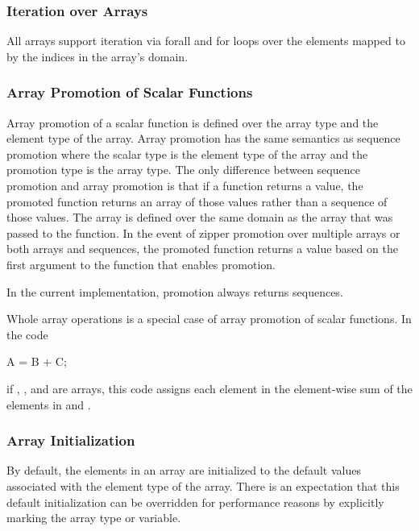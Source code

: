\subsubsection{Iteration over Arrays}
\label{Iteration_over_Arrays}

All arrays support iteration via forall and for loops over the
elements mapped to by the indices in the array's domain.

\subsubsection{Array Promotion of Scalar Functions}
\label{Array_Promotion_of_Scalar_Functions}

Array promotion of a scalar function is defined over the array type
and the element type of the array.  Array promotion has the same
semantics as sequence promotion where the scalar type is the element
type of the array and the promotion type is the array type.  The only
difference between sequence promotion and array promotion is that if a
function returns a value, the promoted function returns an array of
those values rather than a sequence of those values.  The array is
defined over the same domain as the array that was passed to the
function.  In the event of zipper promotion over multiple arrays or
both arrays and sequences, the promoted function returns a value based
on the first argument to the function that enables promotion.

\begin{implementation}
In the current implementation, promotion always returns sequences.
\end{implementation}

\begin{example}
Whole array operations is a special case of array promotion of scalar
functions.  In the code
\begin{chapel}
A = B + C;
\end{chapel}
if , , and  are arrays, this code assigns each
element in  the element-wise sum of the elements in 
and .
\end{example}

\subsubsection{Array Initialization}
\label{Array_Initialization}

By default, the elements in an array are initialized to the default
values associated with the element type of the array.  There is an
expectation that this default initialization can be overridden for
performance reasons by explicitly marking the array type or variable.

